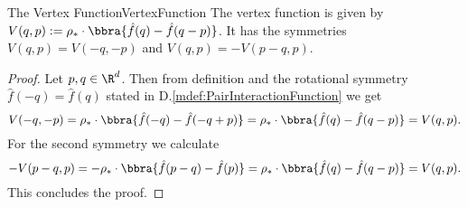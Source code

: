 \begin{msatdef}{The Vertex Function}{VertexFunction}
    The vertex function is given by $V(q,p):= \rho_*\cdot\bbra{\hat f(q) - \hat f(q - p)}$. It has the symmetries $V(q,p) = V(-q,-p)$ and $V(q,p) = -V(p-q,p)$.
\end{msatdef}
\begin{proof}
    Let $p,q\in\R^d$. Then from definition and the rotational symmetry $\hat f(-q) = \hat f(q)$ stated in D.\ref{mdef:PairInteractionFunction} we get
    \[
        V(-q,-p) = \rho_*\cdot\bbra{\hat f(-q) - \hat f(-q + p)} = \rho_*\cdot\bbra{\hat f(q) - \hat f(q - p)} = V(q,p).
    \]
    For the second symmetry we calculate
    \[
        -V(p-q,p) = -\rho_*\cdot\bbra{\hat f(p-q) - \hat f(p)} = \rho_*\cdot\bbra{\hat f(q) - \hat f(q - p)} = V(q,p).
    \]
    This concludes the proof.
\end{proof}